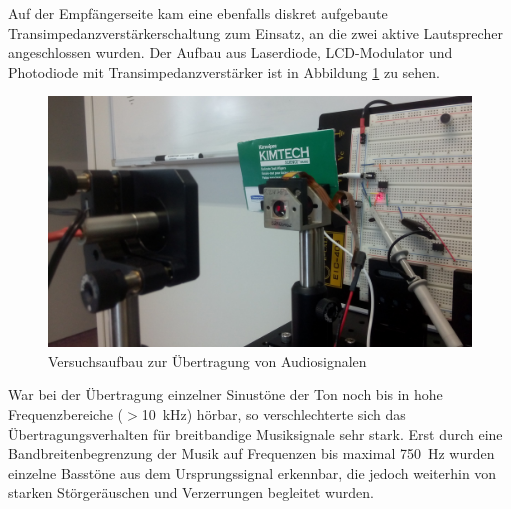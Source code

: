\documentclass[12pt,a4paper]{article}
\begin{document}
Auf der Empfängerseite kam eine ebenfalls diskret aufgebaute Transimpedanzverstärkerschaltung zum Einsatz, an die zwei aktive Lautsprecher angeschlossen wurden. Der Aufbau aus Laserdiode, LCD-Modulator und Photodiode mit Transimpedanzverstärker ist in Abbildung \ref{fig:photo_lcd_experiment} zu sehen.

\begin{figure}[H]
  \centering
    \includegraphics[width=\textwidth]{img/photo_lcd_experiment.jpg}
  \caption{Versuchsaufbau zur Übertragung von Audiosignalen}
  \label{fig:photo_lcd_experiment}
\end{figure}

War bei der Übertragung einzelner Sinustöne der Ton noch bis in hohe Frequenzbereiche ($>$\SI{10}{\kilo\hertz}) hörbar, so verschlechterte sich das Übertragungsverhalten für breitbandige Musiksignale sehr stark. Erst durch eine Bandbreitenbegrenzung der Musik auf Frequenzen bis maximal \SI{750}{\hertz} wurden einzelne Basstöne aus dem Ursprungssignal erkennbar, die jedoch weiterhin von starken Störgeräuschen und Verzerrungen begleitet wurden.
\end{document}
